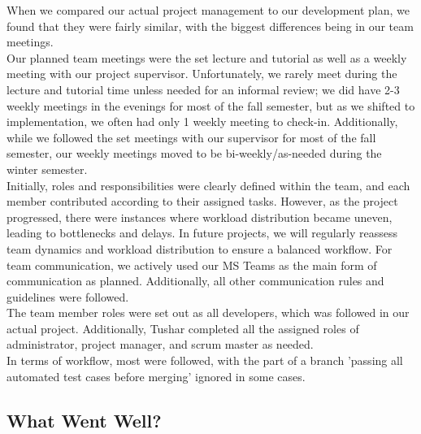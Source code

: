 \documentclass{article}
\begin{document}
When we compared our actual project management to our development plan, we found that they were fairly similar, with the biggest differences being in our team meetings. \\
Our planned team meetings were the set lecture and tutorial as well as a weekly meeting with our project supervisor. Unfortunately, we rarely meet during the lecture and tutorial time unless needed for an informal review; we did have 2-3 weekly meetings in the evenings for most of the fall semester, but as we shifted to implementation, we often had only 1 weekly meeting to check-in. Additionally, while we followed the set meetings with our supervisor for most of the fall semester, our weekly meetings moved to be bi-weekly/as-needed during the winter semester. \\
Initially, roles and responsibilities were clearly defined within the team, and each member contributed according to their assigned tasks. However, as the project progressed, there were instances where workload distribution became uneven, leading to bottlenecks and delays. In future projects, we will regularly reassess team dynamics and workload distribution to ensure a balanced workflow. 
For team communication, we actively used our MS Teams as the main form of communication as planned. Additionally, all other communication rules and guidelines were followed. \\
The team member roles were set out as all developers, which was followed in our actual project. Additionally, Tushar completed all the assigned roles of administrator, project manager, and scrum master as needed. \\
In terms of workflow, most were followed, with the part of a branch 'passing all automated test cases before merging' ignored in some cases. 

\subsection{What Went Well?}
\end{document}
